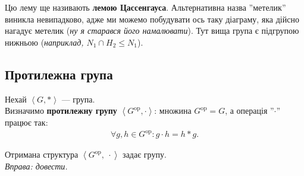 \documentclass{math_library}
\begin{document}
\begin{remark}
Цю лему ще називають \textbf{лемою Цассенгауса}. Альтернативна назва ''метелик'' виникла невипадково, адже ми можемо побудувати ось таку діаграму, яка дійсно нагадує метелик (\textit{ну я старався його намалювати}). Тут вища група є підгрупою нижньою (\textit{наприклад, $N_1 \cap H_2 \leq N_1$}).
\begin{figure}[H]
\centering
{}
\end{figure}
\end{remark}

\subsection{Протилежна група}
\begin{definition}
Нехай $\left<G,*\right>$ --- група.\\
Визначимо \textbf{протилежну групу} $\left< G^{\text{op}}, \cdot \right>$: множина $G^{\text{op}} = G$, а операція ''$\cdot$'' працює так:
\begin{align*}
\forall g,h \in G^{\text{op}}: g \cdot h = h*g.
\end{align*}
\end{definition}

\begin{proposition}
Отримана структура $\left< G^{\text{op}},\ \cdot \right>$ задає групу.\\
\textit{Вправа: довести.}
\end{proposition}
\end{document}
